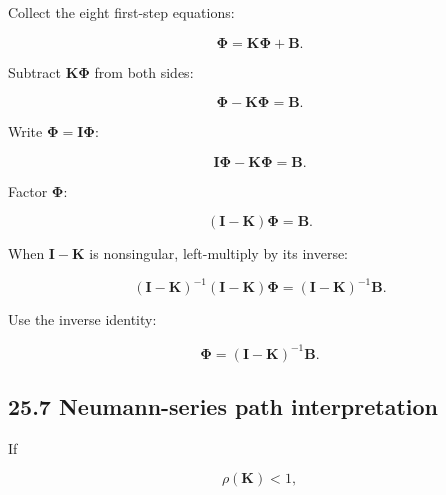 \documentclass[11pt,a4paper]{article}
\begin{document}
Collect the eight first-step equations:

\begin{equation}
\boldsymbol\Phi
=
\mathbf K\boldsymbol\Phi
+
\mathbf B.
\tag{TRISO-MR-022}
\label{eq:triso-mr-022}
\end{equation}

Subtract $\mathbf K\boldsymbol\Phi$ from both sides:

\begin{equation}
\boldsymbol\Phi
-
\mathbf K\boldsymbol\Phi
=
\mathbf B.
\tag{TRISO-MR-023}
\label{eq:triso-mr-023}
\end{equation}

Write $\boldsymbol\Phi=\mathbf I\boldsymbol\Phi$:

\begin{equation}
\mathbf I\boldsymbol\Phi
-
\mathbf K\boldsymbol\Phi
=
\mathbf B.
\tag{TRISO-MR-024}
\label{eq:triso-mr-024}
\end{equation}

Factor $\boldsymbol\Phi$:

\begin{equation}
(\mathbf I-\mathbf K)\boldsymbol\Phi
=
\mathbf B.
\tag{TRISO-MR-025}
\label{eq:triso-mr-025}
\end{equation}

When $\mathbf I-\mathbf K$ is nonsingular, left-multiply by its inverse:

\begin{equation}
(\mathbf I-\mathbf K)^{-1}
(\mathbf I-\mathbf K)
\boldsymbol\Phi
=
(\mathbf I-\mathbf K)^{-1}\mathbf B.
\tag{TRISO-MR-026}
\label{eq:triso-mr-026}
\end{equation}

Use the inverse identity:

\begin{equation}
\boxed{
\boldsymbol\Phi
=
(\mathbf I-\mathbf K)^{-1}\mathbf B.
}
\tag{TRISO-MR-027}
\label{eq:triso-mr-027}
\end{equation}

\subsection*{25.7 Neumann-series path interpretation}

If

\begin{equation}
\rho(\mathbf K)<1,
\tag{TRISO-MR-028}
\label{eq:triso-mr-028}
\end{equation}
\end{document}
